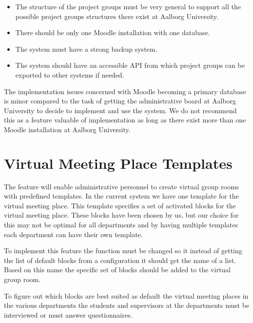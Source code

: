 \begin{itemize}
	\item The structure of the project groups must be very general to support all the possible project groups structures there exist at Aalborg University. 
	\item There should be only one Moodle installation with one database. 
	\item The system must have a strong backup system.
	\item The system should have an accessible API from which project groups can be exported to other systems if needed. 
\end{itemize}

The implementation issues concerned with Moodle becoming a primary database is minor compared to the task of getting the administrative board at Aalborg University to decide to implement and use the system. 
We do not recommend this as a feature valuable of implementation as long as there exist more than one Moodle installation at Aalborg University. 


\section{Virtual Meeting Place Templates} 
The feature will enable administrative personnel to create virtual group rooms with predefined templates.
In the current system we have one template for the virtual meeting place. 
This template specifies a set of activated blocks for the virtual meeting place. 
These blocks have been chosen by us, but our choice for this may not be optimal for all departments and by having multiple templates each department can have their own template.

To implement this feature the function  must be changed so it instead of getting the list of default blocks from a configuration it should get the name of a list.
Based on this name the specific set of blocks should be added to the virtual group room.

To figure out which blocks are best suited as default the virtual meeting places in the various departments the students and supervisors at the departments must be interviewed or must answer questionnaires. 
